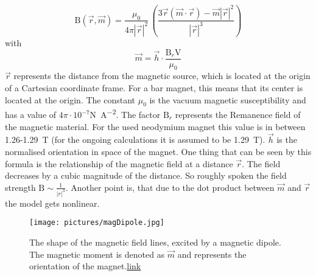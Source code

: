 \begin{equation} \label{eq:dipole}
\mathrm{B}(\vec{r},\vec{m}) = 
\frac{\mu_{0}}{4 \pi |\vec{r}|^{2}} \, \left (\frac{3 \vec{r} (\vec{m} \cdot \vec{r}) - \vec{m}|\vec{r}|^{2} }{|\vec{r}|^3} \right)						
\end{equation}
with 
\begin{equation} \label{eq:magMoment}
\vec{m} = \vec{h} \cdot \frac{\mathrm{B}_r \mathrm{V}}{\mu_{0}}
\end{equation}
$ \vec{r} $ represents the distance from the magnetic source, which is located at the origin of a Cartesian coordinate frame. For a bar magnet, this means that its center is located at the origin. The constant $ \mu_{0} $ is the vacuum magnetic susceptibility \cite{camacho2013alternative} and has a value of $ 4 \pi \cdot 10^{-7} $\si[per-mode=fraction]{\newton \per \ampere \squared}. The factor $ \mathrm{B}_r $ represents the Remanence field of the magnetic material. For the used neodymium magnet this value is in between 1.26-\SI{1.29}{\tesla} (for the ongoing calculations it is assumed to be \SI{1.29}{\tesla}). $ \vec{h} $ is the normalised orientation in space of the magnet. One thing that can be seen by this formula is the relationship of the magnetic field at a distance $ \vec{r} $. The field decreases by a cubic magnitude of the distance. So roughly spoken the field strength $ \mathrm{B} \sim \frac{1}{|r|^ {3}}$. Another point is, that due to the dot product between $ \vec{m} $ and $ \vec{r} $ the model gets nonlinear.

\begin{figure}
\centering
\texttt{[image: pictures/magDipole.jpg]}
\caption{The shape of the magnetic field lines, excited by a magnetic dipole. The magnetic moment is denoted as $ \vec{m} $ and represents the orientation of the magnet.\href{http://cdn1.askiitians.com/Images/201529-161356533-148-download.jpg}{link}}
\label{fig:magDipole}
\end{figure}

